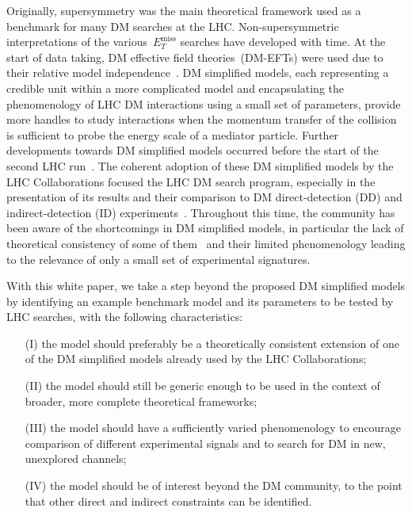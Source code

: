 \documentclass[a4paper, 11pt,notoc]{article}
\newcommand{\MET}{\ensuremath{E_T^\mathrm{miss}}\xspace}
\begin{document}
Originally, supersymmetry was the main theoretical framework used as a benchmark for many DM searches at the LHC.  Non-supersymmetric interpretations of the various~$\MET$ searches have  developed with time. At the start of data taking, DM effective field theories~(DM-EFTs)  were used due to their relative model independence~\cite{Cao:2009uw,Beltran:2010ww,Goodman:2010yf,Bai:2010hh,Goodman:2010ku,Fox:2011pm}.  DM simplified models, each representing a credible unit within a more complicated model and encapsulating the phenomenology of LHC DM interactions using a small set of parameters, provide more handles to study interactions when the momentum transfer of the collision is sufficient to probe the energy scale of a mediator particle. Further developments towards DM simplified models occurred before the start of the second LHC run~\cite{Abdallah:2015ter,Abercrombie:2015wmb}.  The coherent adoption of these DM simplified models by the LHC Collaborations focused the LHC DM search program, especially in the presentation of its results and their comparison to DM direct-detection (DD) and indirect-detection (ID) experiments~\cite{Boveia:2016mrp,Albert:2017onk}.  Throughout this time, the community has been aware of the shortcomings in DM simplified models, in particular the lack of theoretical consistency of some of them~\cite{Chala:2015ama,Bell:2015sza,Kahlhoefer:2015bea,Bell:2015rdw,Haisch:2016usn,Englert:2016joy,Ko:2016zxg} and their limited phenomenology leading to the relevance of only a small set of experimental signatures.  

With this white paper, we take a step beyond the proposed DM simplified models by identifying an example benchmark model and its parameters to be tested by LHC searches, with the following characteristics: 
\begin{itemize}
\item[(I)] the model should preferably be a theoretically consistent extension of one of the DM simplified models already used by the LHC Collaborations;
\item[(II)] the model should still be generic enough to be used in the context of broader, more complete theoretical frameworks;  
\item[(III)] the model should have a sufficiently varied phenomenology to encourage comparison of different experimental signals and to search for DM in new, unexplored channels;
\item[(IV)] the model should be of interest beyond the DM community, to the point that other direct and indirect constraints can be identified.
\end{itemize}
\end{document}

